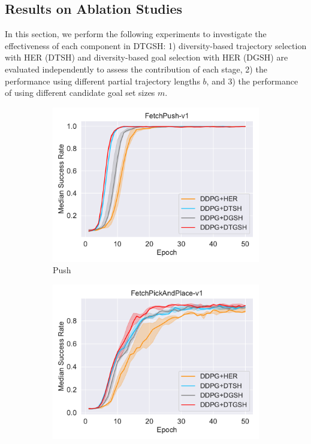 \subsection{Results on Ablation Studies}
In this section, we perform the following experiments to investigate the effectiveness of each component in DTGSH: 1) diversity-based trajectory selection with HER (DTSH) and diversity-based goal selection with HER (DGSH) are evaluated independently to assess the contribution of each stage, 2) the performance using different partial trajectory lengths $b$, and 3) the performance of using different candidate goal set sizes $m$.
\begin{figure}[h!]
  \centering
  \begin{subfigure}[t]{0.49\textwidth}
    \includegraphics[width=\textwidth]{figures/chapter4/FetchPush-v1_ab1.pdf}
    \caption{Push}
    \label{subfig:baseline_push_ab1}
  \end{subfigure}\hfill
  \begin{subfigure}[t]{0.49\textwidth}
    \includegraphics[width=\textwidth]{figures/chapter4/FetchPickAndPlace-v1_ab1.pdf}

\end{subfigure}
\end{figure}
